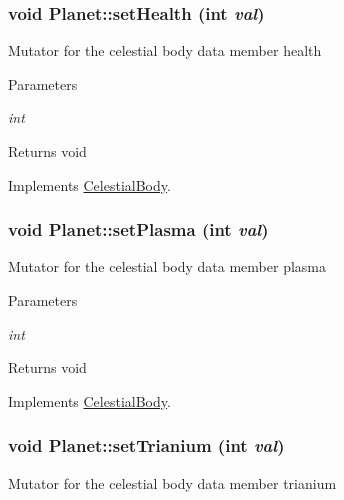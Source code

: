 \hypertarget{classPlanet_aa3ade00566dc836084395a25adc2cdb8}{
\subsubsection[{setHealth}]{\setlength{\rightskip}{0pt plus 5cm}void Planet::setHealth (int {\em val})}}
\label{d5/dec/classPlanet_aa3ade00566dc836084395a25adc2cdb8}
Mutator for the celestial body data member health


\begin{DoxyParams}{Parameters}
\item[{\em int}]\end{DoxyParams}
\begin{DoxyReturn}{Returns}
void 
\end{DoxyReturn}


Implements \hyperlink{classCelestialBody}{CelestialBody}.

\hypertarget{classPlanet_a227e20f2716a12afddf50eddcd7c10c5}{
\subsubsection[{setPlasma}]{\setlength{\rightskip}{0pt plus 5cm}void Planet::setPlasma (int {\em val})}}
\label{d5/dec/classPlanet_a227e20f2716a12afddf50eddcd7c10c5}
Mutator for the celestial body data member plasma


\begin{DoxyParams}{Parameters}
\item[{\em int}]\end{DoxyParams}
\begin{DoxyReturn}{Returns}
void 
\end{DoxyReturn}


Implements \hyperlink{classCelestialBody}{CelestialBody}.

\hypertarget{classPlanet_a298ae0e6344b5e83b4c53e5377b0531f}{
\subsubsection[{setTrianium}]{\setlength{\rightskip}{0pt plus 5cm}void Planet::setTrianium (int {\em val})}}
\label{d5/dec/classPlanet_a298ae0e6344b5e83b4c53e5377b0531f}
Mutator for the celestial body data member trianium


